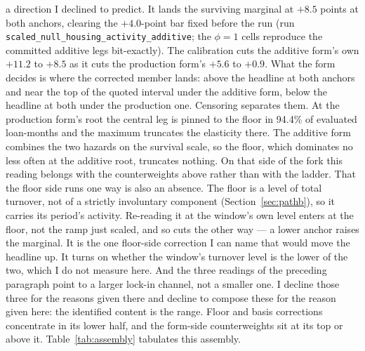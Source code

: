 \documentclass[12pt]{article}
\begin{document}
a direction I declined to predict. It lands the surviving marginal at $+8.5$ points at both anchors, clearing the $+4.0$-point bar fixed before the run (run \texttt{scaled\_null\_housing\_activity\_additive}; the $\phi = 1$ cells reproduce the committed additive legs bit-exactly). The calibration cuts the additive form's own $+11.2$ to $+8.5$ as it cuts the production form's $+5.6$ to $+0.9$. What the form decides is where the corrected member lands: above the headline at both anchors and near the top of the quoted interval under the additive form, below the headline at both under the production one. Censoring separates them. At the production form's root the central leg is pinned to the floor in 94.4\% of evaluated loan-months and the maximum truncates the elasticity there. The additive form combines the two hazards on the survival scale, so the floor, which dominates no less often at the additive root, truncates nothing. On that side of the fork this reading belongs with the counterweights above rather than with the ladder. That the floor side runs one way is also an absence. The floor is a level of total turnover, not of a strictly involuntary component (Section~\ref{sec:pathb}), so it carries its period's activity. Re-reading it at the window's own level enters at the floor, not the ramp just scaled, and so cuts the other way --- a lower anchor raises the marginal. It is the one floor-side correction I can name that would move the headline up. It turns on whether the window's turnover level is the lower of the two, which I do not measure here. And the three readings of the preceding paragraph point to a larger lock-in channel, not a smaller one. I decline those three for the reasons given there and decline to compose these for the reason given here: the identified content is the range. Floor and basis corrections concentrate in its lower half, and the form-side counterweights sit at its top or above it. Table~\ref{tab:assembly} tabulates this assembly.
\end{document}
